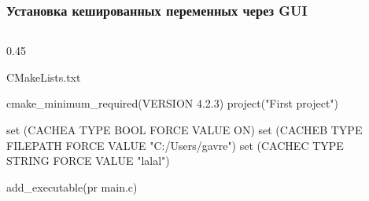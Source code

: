\documentclass[10pt, aspectratio=1610]{beamer}
\begin{document}
\begin{frame}[fragile]\frametitle{Установка кешированных переменных через GUI}
	
	\begin{columns}[]
		\edef\colA{0.45}
		\begin{column}{\colA\linewidth}
			\begin{block}{CMakeLists.txt}
			\begin{cmakecode}
				cmake_minimum_required(VERSION 4.2.3)
				project("First project")
				
				set (CACHE{A} TYPE BOOL 
					FORCE VALUE ON)
				set (CACHE{B}  TYPE FILEPATH 
					FORCE VALUE "C:/Users/gavre")
				set (CACHE{C}  TYPE STRING 
					FORCE VALUE "lalal")
				
				add_executable(pr main.c)
			\end{cmakecode}
			\end{block}
		\end{column}
		\begin{column}{\fpeval{1-\colA}\linewidth}
		\end{column}
	\end{columns}
		
\end{frame}
\end{document}
